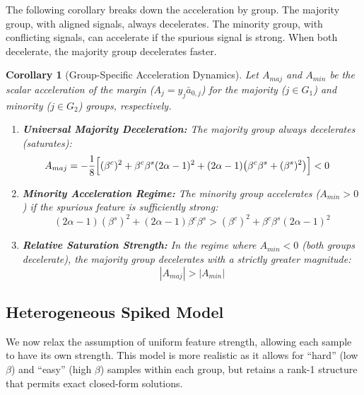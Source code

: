 \documentclass[letter,11pt]{article}
\newtheorem{corollary}{Corollary}
\begin{document}
The following corollary breaks down the acceleration by group. The majority group, with aligned signals, always decelerates. The minority group, with conflicting signals, can accelerate if the spurious signal is strong. When both decelerate, the majority group decelerates faster.
\begin{corollary}[Group-Specific Acceleration Dynamics]\label{cor:homo_accel_dynamics}
    Let $A_{maj}$ and $A_{min}$ be the scalar acceleration of the margin ($A_j = y_j \bar{a}_{0,j}$) for the majority ($j \in G_1$) and minority ($j \in G_2$) groups, respectively.
    \begin{enumerate}
        \item \textbf{Universal Majority Deceleration:} The majority group always decelerates (saturates):
        \begin{align}
        A_{maj}
        &= -\frac{1}{8} \Big[
            (\beta^c)^2
            + \beta^c \beta^s (2\alpha - 1)^2 \notag
            + (2\alpha - 1)\big( \beta^c \beta^s + (\beta^s)^2 \big)
        \Big] < 0
        \end{align}
        \item \textbf{Minority Acceleration Regime:} The minority group accelerates ($A_{min} > 0$) if the spurious feature is sufficiently strong:
        \begin{equation}
            (2\alpha - 1) (\beta^s)^2 + (2\alpha - 1)\beta^c\beta^s > (\beta^c)^2 + \beta^c\beta^s(2\alpha - 1)^2
        \end{equation}
        \item \textbf{Relative Saturation Strength:} In the regime where $A_{min} < 0$ (both groups decelerate), the majority group decelerates with a strictly greater magnitude:
        \begin{equation}
            |A_{maj}| > |A_{min}|
        \end{equation}
    \end{enumerate}
\end{corollary}


\subsection{Heterogeneous Spiked Model}\label{sec:het-spiked}

We now relax the assumption of uniform feature strength, allowing each sample to have its own strength. This model is more realistic as it allows for ``hard'' (low $\beta$) and ``easy'' (high $\beta$) samples within each group, but retains a rank-1 structure that permits exact closed-form solutions.
\end{document}
